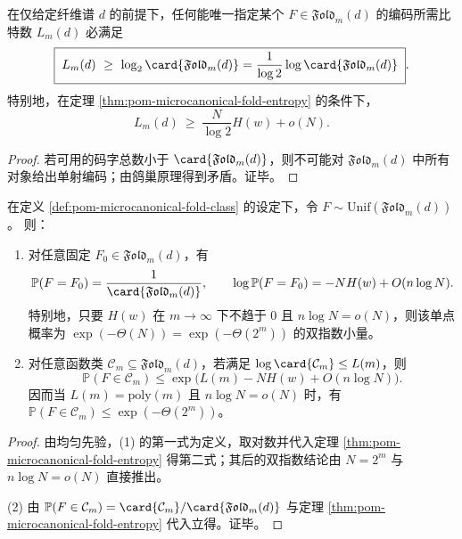 \begin{corollary}\label{cor:pom-microcanonical-fold-description-length-lower-bound}
在仅给定纤维谱 \(d\) 的前提下，任何能唯一指定某个 \(F\in\mathfrak{Fold}_m(d)\) 的编码所需比特数 \(L_m(d)\) 必满足
\[
\boxed{\;
L_m(d)\ \ge\ \log_2\card{\mathfrak{Fold}_m(d)}
=\frac{1}{\log 2}\log\card{\mathfrak{Fold}_m(d)}\; } .
\]
特别地，在定理 \ref{thm:pom-microcanonical-fold-entropy} 的条件下，
\[
L_m(d)\ \ge\ \frac{N}{\log 2}H(w)+o(N).
\]
\end{corollary}
\begin{proof}
若可用的码字总数小于 \(\card{\mathfrak{Fold}_m(d)}\)，则不可能对 \(\mathfrak{Fold}_m(d)\) 中所有对象给出单射编码；由鸽巢原理得到矛盾。证毕。
\end{proof}

\begin{corollary}[单点稀有性与低复杂度类的双指数稀薄性]\label{cor:pom-microcanonical-fold-singleton-and-low-complexity-rarity}
在定义 \ref{def:pom-microcanonical-fold-class} 的设定下，令 \(F\sim\mathrm{Unif}(\mathfrak{Fold}_m(d))\)。
则：
\begin{enumerate}
  \item 对任意固定 \(F_0\in\mathfrak{Fold}_m(d)\)，有
  \[
  \mathbb P(F=F_0)=\frac{1}{\card{\mathfrak{Fold}_m(d)}},
  \qquad
  \log\mathbb P(F=F_0)=-N H(w)+O(n\log N).
  \]
  特别地，只要 \(H(w)\) 在 \(m\to\infty\) 下不趋于 \(0\) 且 \(n\log N=o(N)\)，则该单点概率为 \(\exp(-\Theta(N))=\exp(-\Theta(2^m))\) 的双指数小量。
  \item 对任意函数类 \(\mathcal C_m\subseteq\mathfrak{Fold}_m(d)\)，若满足 \(\log\card{\mathcal C_m}\le L(m)\)，则
  \[
  \mathbb P(F\in\mathcal C_m)\le \exp\!\bigl(L(m)-N H(w)+O(n\log N)\bigr).
  \]
  因而当 \(L(m)=\mathrm{poly}(m)\) 且 \(n\log N=o(N)\) 时，有 \(\mathbb P(F\in\mathcal C_m)\le \exp(-\Theta(2^m))\)。
\end{enumerate}
\end{corollary}
\begin{proof}
由均匀先验，(1) 的第一式为定义，取对数并代入定理 \ref{thm:pom-microcanonical-fold-entropy} 得第二式；其后的双指数结论由 \(N=2^m\) 与 \(n\log N=o(N)\) 直接推出。
\par
(2) 由 \(\mathbb P(F\in\mathcal C_m)=\card{\mathcal C_m}/\card{\mathfrak{Fold}_m(d)}\) 与定理 \ref{thm:pom-microcanonical-fold-entropy} 代入立得。证毕。
\end{proof}



